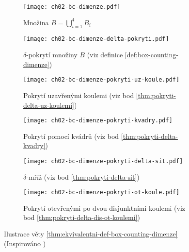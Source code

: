 \begin{figure}
    \centering
    \begin{subfigure}{0.4\textwidth}
        \centering
        \texttt{[image: ch02-bc-dimenze.pdf]}
        \caption{Množina $B=\bigcup_{i=1}^4 B_i$}
        \label{subfig:bc-dimenze-pokryvana-mnozina}
    \end{subfigure}
    \qquad
    \begin{subfigure}{0.4\textwidth}
        \centering
        \texttt{[image: ch02-bc-dimenze-delta-pokryti.pdf]}
        \caption{$\delta$-pokrytí množiny $B$ (viz definice \ref{def:box-counting-dimenze})}
        \label{subfig:bc-dimenze-delta-pokryti}
    \end{subfigure}
    \qquad
    \begin{subfigure}{0.4\textwidth}
        \centering
        \texttt{[image: ch02-bc-dimenze-pokryti-uz-koule.pdf]}
        \caption{Pokrytí uzavřenými koulemi (viz bod \ref{thm:pokryti-delta-uz-koulemi})}
        \label{subfig:bc-dimenze-uz-koule}
    \end{subfigure}
    \qquad
    \begin{subfigure}{0.4\textwidth}
        \centering
        \texttt{[image: ch02-bc-dimenze-pokryti-kvadry.pdf]}
        \caption{Pokrytí pomocí kvádrů (viz bod \ref{thm:pokryti-delta-kvadry})}
        \label{subfig:bc-dimenze-kvadry}
    \end{subfigure}
    \qquad
    \begin{subfigure}{0.4\textwidth}
        \centering
        \texttt{[image: ch02-bc-dimenze-pokryti-delta-sit.pdf]}
        \caption{$\delta$-mříž (viz bod \ref{thm:pokryti-delta-sit})}
        \label{subfig:bc-dimenze-delta-sit}
    \end{subfigure}
    \qquad
    \begin{subfigure}{0.4\textwidth}
        \centering
        \texttt{[image: ch02-bc-dimenze-pokryti-ot-koule.pdf]}
        \caption{Pokrytí otevřenými po dvou disjunktními koulemi (viz bod \ref{thm:pokryti-delta-dis-ot-koulemi})}
        \label{subfig:bc-dimenze-ot-koule}
    \end{subfigure}
    \caption[Ilustrace věty \ref{thm:ekvivalentni-def-box-counting-dimenze}]{Ilustrace věty \ref{thm:ekvivalentni-def-box-counting-dimenze} (Inspirováno \citep[str. 29]{Falconer2014})}
    \label{fig:ilustrace-definic-bc-dimenze}
\end{figure}

